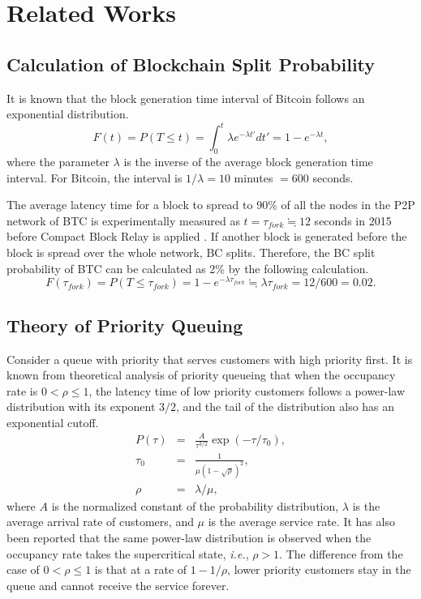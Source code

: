 \documentclass[graybox]{svmult}
\begin{document}
\section{Related Works}
\label{sec:rworks}

\subsection{Calculation of Blockchain Split Probability}
\label{sec:fork}

It is known that the block generation time interval of Bitcoin follows an exponential distribution. 
%
\begin{equation}
	F(t) = P(T \le t) = \int_{0}^{t} \lambda e^{-\lambda t'} dt' = 1 - e^{-\lambda t}, \label{eq:exp}
\end{equation}
where the parameter $\lambda$ is the inverse of the average block generation time interval.
For Bitcoin, the interval is $1 / \lambda = 10$ minutes $= 600$ seconds.


The average latency time for a block to spread to 90\% of all the nodes in the P2P network of BTC is experimentally measured as $t = \tau_{fork} \fallingdotseq 12$ seconds in 2015 before Compact Block Relay is applied \cite{bloX}. 
If another block is generated before the block is spread over the whole network, BC splits. 
Therefore, the BC split probability of BTC can be calculated as 2\% by the following calculation. 
%
\begin{equation}
  F(\tau_{fork}) = P(T \le \tau_{fork}) = 1 - e^{-\lambda \tau_{fork}} \fallingdotseq \lambda \tau_{fork} = 12/600 = 0.02. 
\end{equation}
%



\subsection{Theory of Priority Queuing}
\label{sec:priorityqueue}

Consider a queue with priority that serves customers with high priority first. 
It is known from theoretical analysis of priority queueing that when the occupancy rate is $0 < \rho \le1 $, the latency time of low priority customers follows a power-law distribution with its exponent $3/2$, and the tail of the distribution also has an exponential cutoff\cite{OB2005}. 
%
\begin{eqnarray}
  P(\tau) &=& \frac{A}{\tau^{3/2}} \exp(-\tau/\tau_0), \\
  \tau_0  &=& \frac{1}{\mu (1-\sqrt{\rho})^2}, \\
  \rho    &=& \lambda / \mu,
\end{eqnarray}
%
where $A$ is the normalized constant of the probability distribution, $\lambda$ is the average arrival rate of customers, and $\mu$ is the average service rate.
It has also been reported that the same power-law distribution is observed when the occupancy rate takes the supercritical state, \textit{i.e.}, $\rho > 1$. 
The difference from the case of $0 < \rho \le 1$ is that at a rate of $1 -1 / \rho $, lower priority customers stay in the queue and cannot receive the service forever. 
\end{document}
